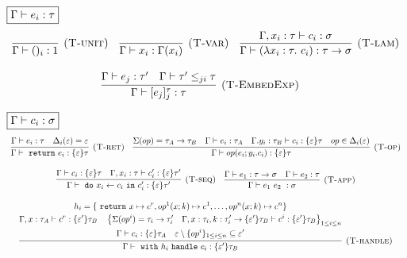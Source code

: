 \begin{figure}[t]
\footnotesize{
\noindent$\fbox{$\Gamma \vdash e_i : \tau$}$
\[
\begin{array}{c}

\infer[\textsc{(T-unit)}]
  {\Gamma \vdash ()_i : 1}
  {} \quad 

\infer[\textsc{(T-var)}]
  {\Gamma \vdash x_i : \Gamma(x_i)}
  {} \quad 

\infer[\textsc{(T-lam)}]
  {\Gamma \vdash (\lambda x_i: \tau.\ c_i) : \tau \rightarrow \sigma}
  {\Gamma, x_i:\tau \vdash c_i : \sigma} \\[3ex]
  
\infer[\textsc{(T-EmbedExp)}]
  {\Gamma \vdash [e_j]^\tau_j : \tau}
  {\Gamma \vdash e_j : \tau' & \Gamma \vdash \tau' \leq_{ji} \tau} \quad  
\end{array} \\[3ex]
\]


\noindent$\fbox{$\Gamma \vdash c_i : \sigma$}$
\[
\begin{array}{c}

\infer[\textsc{(T-ret)}]
  {\Gamma\vdash \m{return} e_i : \{\varepsilon\}\tau }
  {\Gamma\vdash e_i : \tau & \Delta_i(\varepsilon) = \varepsilon} \quad 
  
\infer[\textsc{(T-op)}]
  {\Gamma\vdash op(e_i; y_i.c_i) : \{\varepsilon\}\tau }
  {\Sigma(op) = \tau_A \rightarrow \tau_B & \Gamma \vdash e_i : \tau_A & \Gamma. y_i:\tau_B\vdash c_i: \{\varepsilon\}\tau & op \in \Delta_i(\varepsilon)} \\[3ex]


\infer[\textsc{(T-seq)}]
  {\Gamma\vdash \m{do} x_i \leftarrow c_i \m{in} c_i' : \{\varepsilon\}\tau' }
  {\Gamma \vdash c_i : \{\varepsilon\}\tau & \Gamma, x_i:\tau \vdash c_i': \{\varepsilon\}\tau'} \quad 
  
  
\infer[\textsc{(T-app)}]
  {\Gamma\vdash e_1\ e_2\ : \sigma }
  {\Gamma \vdash e_1 : \tau \rightarrow \sigma & \Gamma \vdash e_2 : \tau} \\[3ex]
  
\infer[\textsc{(T-handle)}]
  {\Gamma\vdash \m{with} h_i \m{handle} c_i: \{\varepsilon'\} \tau_B}
  {\begin{gathered}
  h_i = \{\m{return} x \mapsto c^r, op^1(x;k) \mapsto c^1, \dots, op^n(x;k) \mapsto c^n \}\\
  \Gamma, x: \tau_A \vdash c^r : \{\varepsilon'\}\tau_B \quad
  \left\{ \Sigma(op^i) = \tau_i \rightarrow \tau_i'  \quad \Gamma, x:\tau_i, k:\tau_i' \rightarrow \{\varepsilon'\}\tau_B \vdash c^i: \{\varepsilon'\}\tau_B    \right\}_{1 \leq i \leq n} \\
  \Gamma \vdash c_i : \{\varepsilon\}\tau_A \quad \varepsilon \setminus \{op^i\}_{1 \leq i \leq n} \subseteq \varepsilon'
  \end{gathered}} \\[3ex]
  

\end{array}\]}
\end{figure}
